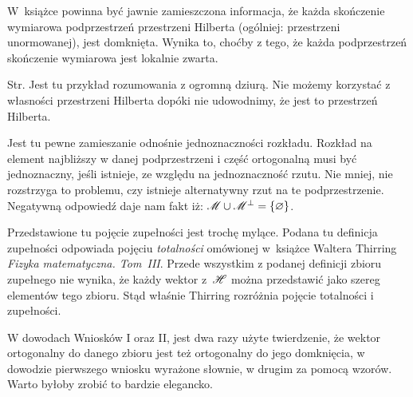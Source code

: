 \documentclass[a4paper,11pt]{article}
\numberwithin{equation}{section}
\begin{document}

\vspace{0em}



\vspace{0em}


\noindent
W~książce powinna być jawnie zamieszczona informacja, że każda skończenie
wymiarowa podprzestrzeń przestrzeni Hilberta (ogólniej: przestrzeni
unormowanej), jest domknięta. Wynika to, choćby z tego, że każda
podprzestrzeń skończenie wymiarowa jest lokalnie zwarta.

\VerSpaceFour





\noindent
Str. Jest tu przykład rozumowania z ogromną dziurą. Nie możemy
korzystać z własności przestrzeni Hilberta dopóki nie udowodnimy, że
jest to przestrzeń Hilberta.

\VerSpaceFour





\noindent
{} Jest tu pewne zamieszanie odnośnie jednoznaczności
rozkładu. Rozkład na element najbliższy w danej podprzestrzeni i
część ortogonalną musi być jednoznaczny, jeśli istnieje, ze względu
na jednoznaczność rzutu. Nie mniej, nie rozstrzyga to problemu, czy
istnieje alternatywny rzut na te podprzestrzenie. Negatywną odpowiedź
daje nam fakt iż:
$\mathcal{M} \cup \mathcal{M}^{ \bot } = \{ \varnothing \}$.

\VerSpaceFour





\noindent
{} Przedstawione tu pojęcie zupełności jest trochę mylące. Podana tu
definicja zupełności odpowiada pojęciu \textit{totalności} omówionej
w~książce Waltera Thirring \textit{Fizyka matematyczna. Tom~III}. Przede
wszystkim z podanej definicji zbioru zupełnego nie wynika, że każdy wektor
z~$\mathcal{H}$ można przedstawić jako szereg elementów tego zbioru. Stąd właśnie
Thirring rozróżnia pojęcie totalności i zupełności.

\VerSpaceFour





\noindent
{} W dowodach Wniosków I oraz II, jest dwa razy użyte
twierdzenie, że wektor ortogonalny do danego zbioru jest też
ortogonalny do jego domknięcia, w dowodzie pierwszego wniosku
wyrażone słownie, w drugim za pomocą wzorów. Warto byłoby zrobić to
bardzie elegancko.
\end{document}
